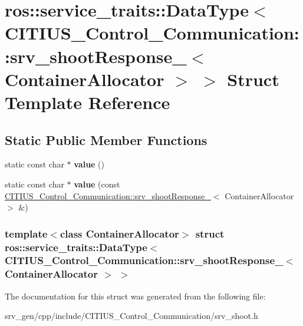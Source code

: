 \hypertarget{structros_1_1service__traits_1_1_data_type_3_01_c_i_t_i_u_s___control___communication_1_1srv__shcf1c62ab4677e1084e324cfb894834c3}{\section{ros\-:\-:service\-\_\-traits\-:\-:\-Data\-Type$<$ \-C\-I\-T\-I\-U\-S\-\_\-\-Control\-\_\-\-Communication\-:\-:srv\-\_\-shoot\-Response\-\_\-$<$ \-Container\-Allocator $>$ $>$ \-Struct \-Template \-Reference}
\label{structros_1_1service__traits_1_1_data_type_3_01_c_i_t_i_u_s___control___communication_1_1srv__shcf1c62ab4677e1084e324cfb894834c3}
}
\subsection*{\-Static \-Public \-Member \-Functions}
\begin{DoxyCompactItemize}
\item 
\hypertarget{structros_1_1service__traits_1_1_data_type_3_01_c_i_t_i_u_s___control___communication_1_1srv__shcf1c62ab4677e1084e324cfb894834c3_afe52a2a44e7cff8e73f765a5d65c9904}{static const char $\ast$ {\bfseries value} ()}\label{structros_1_1service__traits_1_1_data_type_3_01_c_i_t_i_u_s___control___communication_1_1srv__shcf1c62ab4677e1084e324cfb894834c3_afe52a2a44e7cff8e73f765a5d65c9904}

\item 
\hypertarget{structros_1_1service__traits_1_1_data_type_3_01_c_i_t_i_u_s___control___communication_1_1srv__shcf1c62ab4677e1084e324cfb894834c3_ac520c7a598e08cc3e583c3149ceb5d2e}{static const char $\ast$ {\bfseries value} (const \hyperlink{struct_c_i_t_i_u_s___control___communication_1_1srv__shoot_response__}{\-C\-I\-T\-I\-U\-S\-\_\-\-Control\-\_\-\-Communication\-::srv\-\_\-shoot\-Response\-\_\-}$<$ \-Container\-Allocator $>$ \&)}\label{structros_1_1service__traits_1_1_data_type_3_01_c_i_t_i_u_s___control___communication_1_1srv__shcf1c62ab4677e1084e324cfb894834c3_ac520c7a598e08cc3e583c3149ceb5d2e}

\end{DoxyCompactItemize}
\subsubsection*{template$<$class Container\-Allocator$>$ struct ros\-::service\-\_\-traits\-::\-Data\-Type$<$ C\-I\-T\-I\-U\-S\-\_\-\-Control\-\_\-\-Communication\-::srv\-\_\-shoot\-Response\-\_\-$<$ Container\-Allocator $>$ $>$}



\-The documentation for this struct was generated from the following file\-:\begin{DoxyCompactItemize}
\item 
srv\-\_\-gen/cpp/include/\-C\-I\-T\-I\-U\-S\-\_\-\-Control\-\_\-\-Communication/srv\-\_\-shoot.\-h\end{DoxyCompactItemize}
